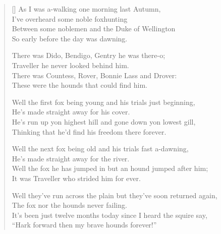 \pagebreak
\settowidth{\versewidth}{Well the first fox being young and his trials just beginning}
\begin{verse}[\versewidth]
As I was a-walking one morning last Autumn,\\
I've overheard some noble foxhunting\\
Between some noblemen and the Duke of Wellington\\
So early before the day was dawning.

\begin{chorus}
There was Dido, Bendigo, Gentry he was there-o;\\
Traveller he never looked behind him.\\
There was Countess, Rover, Bonnie Lass and Drover:\\
These were the hounds that could find him.
\end{chorus}

Well the first fox being young and his trials just beginning,\\
He's made straight away for his cover.\\
He's run up yon highest hill and gone down yon lowest gill,\\
Thinking that he'd find his freedom there forever.

Well the next fox being old and his trials fast a-dawning,\\
He's made straight away for the river.\\
Well the fox he has jumped in but an hound jumped after him;\\
It was Traveller who strided him for ever.

Well they've run across the plain but they've soon returned again,\\
The fox nor the hounds never failing.\\
It's been just twelve months today since I heard the squire say,\\
“Hark forward then my brave hounds forever!”
\end{verse}
